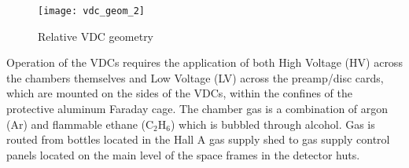 \begin{figure}
\begin{center}
\texttt{[image: vdc\_geom\_2]}
\caption[Detectors: VDC Geometry]{Relative VDC geometry}
\label{fig:trajectory2}
\end{center}
\end{figure}

Operation of the VDCs requires the application of both High Voltage
(HV) across the chambers themselves and Low Voltage (LV) across the
preamp/disc cards, which are mounted on the sides of 
the VDCs, within the confines of the protective aluminum Faraday cage.
The chamber gas is a combination of argon (Ar) and flammable ethane
(C$_2$H$_6$) which is bubbled through alcohol.  Gas is routed from
bottles located in the Hall A gas supply shed to gas supply control
panels located on the main level of the space frames in the detector
huts.

